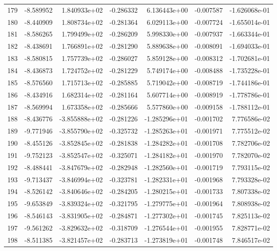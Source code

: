 \begin{tabular}{rrrrrrr}
 179 &  -8.589952 &  1.840933e+02 & -0.286332 &  6.136443e+00 &   -0.007587 & -1.626068e-01 \\
 180 &  -8.440909 &  1.808734e+02 & -0.281364 &  6.029113e+00 &   -0.007724 & -1.655014e-01 \\
 181 &  -8.586265 &  1.799499e+02 & -0.286209 &  5.998330e+00 &   -0.007937 & -1.663344e-01 \\
 182 &  -8.438691 &  1.766891e+02 & -0.281290 &  5.889638e+00 &   -0.008091 & -1.694033e-01 \\
 183 &  -8.580815 &  1.757739e+02 & -0.286027 &  5.859128e+00 &   -0.008312 & -1.702681e-01 \\
 184 &  -8.436873 &  1.724752e+02 & -0.281229 &  5.749174e+00 &   -0.008488 & -1.735228e-01 \\
 185 &  -8.576560 &  1.715713e+02 & -0.285885 &  5.719042e+00 &   -0.008719 & -1.744186e-01 \\
 186 &  -8.434916 &  1.682314e+02 & -0.281164 &  5.607714e+00 &   -0.008919 & -1.778786e-01 \\
 187 &  -8.569994 &  1.673358e+02 & -0.285666 &  5.577860e+00 &   -0.009158 & -1.788112e-01 \\
 188 &  -8.436776 & -3.855888e+02 & -0.281226 & -1.285296e+01 &   -0.001702 &  7.776586e-02 \\
 189 &  -9.771946 & -3.855790e+02 & -0.325732 & -1.285263e+01 &   -0.001971 &  7.775512e-02 \\
 190 &  -8.455126 & -3.852845e+02 & -0.281838 & -1.284282e+01 &   -0.001708 &  7.782706e-02 \\
 191 &  -9.752123 & -3.852547e+02 & -0.325071 & -1.284182e+01 &   -0.001970 &  7.782070e-02 \\
 192 &  -8.488441 & -3.847679e+02 & -0.282948 & -1.282560e+01 &   -0.001719 &  7.793115e-02 \\
 193 &  -9.713437 & -3.846994e+02 & -0.323781 & -1.282331e+01 &   -0.001968 &  7.793328e-02 \\
 194 &  -8.526142 & -3.840646e+02 & -0.284205 & -1.280215e+01 &   -0.001733 &  7.807338e-02 \\
 195 &  -9.653849 & -3.839324e+02 & -0.321795 & -1.279775e+01 &   -0.001964 &  7.808938e-02 \\
 196 &  -8.546143 & -3.831905e+02 & -0.284871 & -1.277302e+01 &   -0.001745 &  7.825113e-02 \\
 197 &  -9.561262 & -3.829632e+02 & -0.318709 & -1.276544e+01 &   -0.001955 &  7.828771e-02 \\
 198 &  -8.511385 & -3.821457e+02 & -0.283713 & -1.273819e+01 &   -0.001748 &  7.846517e-02 \\

\end{tabular}
